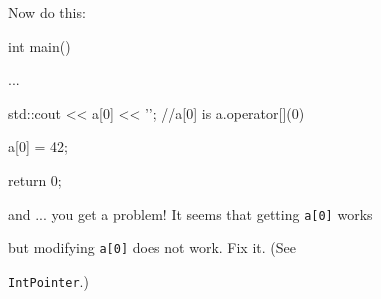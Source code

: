 Now do this:



\begin{consolethree}[escapeinside=||]

int main()

{

    ...

    std::cout << a[0] << '\n'; //a[0] is a.operator[](0)

    a[0] = 42;



    return 0;

}

\end{consolethree}



and ... you get a problem! It seems that getting \texttt{a[0]} works

but modifying \texttt{a[0]} does not work. Fix it. (See

\texttt{IntPointer}.)

